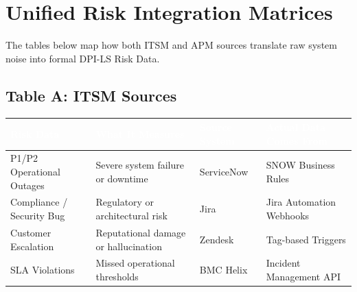 \documentclass[11pt,a4paper]{article}
\begin{document}
\newpage

\section{Unified Risk Integration Matrices}

The tables below map how both ITSM and APM sources translate raw system noise into formal DPI-LS Risk Data.

\subsection{Table A: ITSM Sources}
\begin{table}[H]
\centering
\renewcommand{\arraystretch}{1.4}
\small
{}
\begin{tabularx}{\textwidth}{| >{\raggedright\arraybackslash}X >{\raggedright\arraybackslash}X >{\raggedright\arraybackslash}p{3cm} >{\raggedright\arraybackslash}X |}
\hline
\rowcolor{dpiblue} \textcolor{white}{\textbf{Risk Data}} & \textcolor{white}{\textbf{What It Measures}} & \textcolor{white}{\textbf{Source System}} & \textcolor{white}{\textbf{Actual Data Comes From}} \\
\hline
P1/P2 Operational Outages & Severe system failure or downtime & ServiceNow & SNOW Business Rules \\
Compliance / Security Bug & Regulatory or architectural risk & Jira & Jira Automation Webhooks \\
Customer Escalation & Reputational damage or hallucination & Zendesk & Tag-based Triggers \\
SLA Violations & Missed operational thresholds & BMC Helix & Incident Management API \\
\hline
\end{tabularx}
\end{table}
\end{document}

